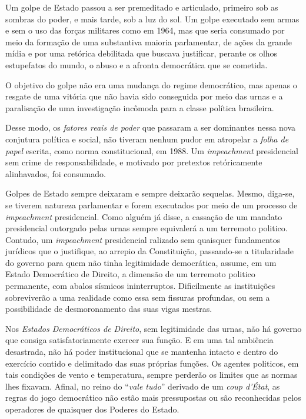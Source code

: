 Um golpe de Estado passou a ser premeditado e articulado, primeiro sob
as sombras do poder, e mais tarde, sob a luz do sol. Um golpe executado
sem armas e sem o uso das forças militares como em 1964, mas que seria
consumado por meio da formação de uma substantiva maioria parlamentar,
de ações da grande mídia e por uma retórica debilitada que buscava
justificar, perante os olhos estupefatos do mundo, o abuso e a afronta
democrática que se cometida.

O objetivo do golpe não era uma mudança do regime democrático, mas
apenas o resgate de uma vitória que não havia sido conseguida por meio
das urnas e a paralisação de uma investigação incômoda para a classe
política brasileira.

Desse modo, os \emph{fatores reais de poder} que passaram a ser
dominantes nessa nova conjutura política e social, não tiveram nenhum
pudor em atropelar a \emph{folha de papel} escrita, como norma
constitucional, em 1988. Um \emph{impeachment} presidencial sem crime de
responsabilidade, e motivado por pretextos retóricamente alinhavados,
foi consumado.

Golpes de Estado sempre deixaram e sempre deixarão sequelas. Mesmo,
diga-se, se tiverem natureza parlamentar e forem executados por meio de
um processo de \emph{impeachment} presidencial. Como alguém já disse, a
cassação de um mandato presidencial outorgado pelas urnas sempre
equivalerá a um terremoto politico. Contudo, um \emph{impeachment}
presidencial ralizado sem quaisquer fundamentos jurídicos que o
justifique, ao arrepio da Constituição, passando-se a titularidade do
governo para quem não tinha legitimidade democrática, assume, em um
Estado Democrático de Direito, a dimensão de um terremoto politico
permanente, com abalos sísmicos ininterruptos. Dificilmente as
instituições sobreviverão a uma realidade como essa sem fissuras
profundas, ou sem a possibilidade de desmoronamento das suas vigas
mestras.

Nos \emph{Estados Democráticos de Direito}, sem legitimidade das urnas,
não há governo que consiga satisfatoriamente exercer sua função. E em
uma tal ambiência desastrada, não há poder institucional que se mantenha
intacto e dentro do exercício contido e delimitado das suas próprias
funções. Os agentes politicos, em tais condições de vento e temperatura,
sempre perderão os limites que as normas lhes fixavam. Afinal, no reino
do ``\emph{vale tudo}'' derivado de um \emph{coup d'État}, as regras do
jogo democrático não estão mais pressupostas ou são reconhecidas pelos
operadores de quaisquer dos Poderes do Estado.

